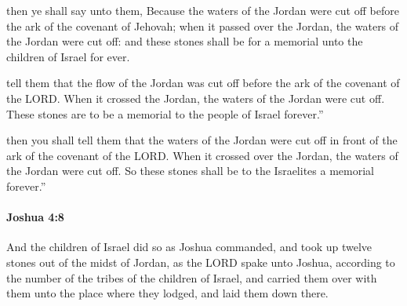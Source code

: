 			\begin{versebox}
					\item[BHS] 
					\item[ASV] then ye shall say unto them, Because the waters of the Jordan were cut off before the ark of the covenant of Jehovah; when it passed over the Jordan, the waters of the Jordan were cut off: and these stones shall be for a memorial unto the children of Israel for ever.
					\item[NIV] tell them that the flow of the Jordan was cut off before the ark of the covenant of the LORD. When it crossed the Jordan, the waters of the Jordan were cut off. These stones are to be a memorial to the people of Israel forever.”
					\item[NRSV] then you shall tell them that the waters of the Jordan were cut off in front of the ark of the covenant of the LORD. When it crossed over the Jordan, the waters of the Jordan were cut off. So these stones shall be to the Israelites a memorial forever.”
			\end{versebox}

		\paragraph{Joshua 4:8} %
			\label{JOSHUA-4-8}

			And the children of Israel did so as Joshua commanded, and took up twelve stones out of the midst of Jordan, as the LORD spake unto Joshua, according to the number of the tribes of the children of Israel, and carried them over with them unto the place where they lodged, and laid them down there.

